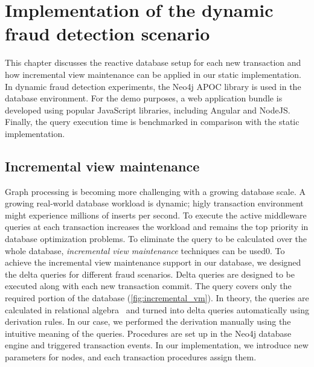 \chapter{Implementation of the dynamic fraud detection scenario}

This chapter discusses the reactive database setup for each new transaction and how incremental view maintenance can be applied in our static implementation.
In dynamic fraud detection experiments, the Neo4j APOC library is used in the database environment.
For the demo purposes, a web application bundle is developed using popular JavaScript libraries, including Angular and NodeJS.
Finally, the query execution time is benchmarked in comparison with the static implementation. 

\section{Incremental view maintenance}

Graph processing is becoming more challenging with a growing database scale.
A growing real-world database workload is dynamic; higly transaction environment might experience millions of inserts per second.
To execute the active middleware queries at each transaction increases the workload and remains the top priority in database optimization problems.
To eliminate the query to be calculated over the whole database, \emph{incremental view maintenance} techniques can be used0.
To achieve the incremental view maintenance support in our database, we designed the delta queries for different fraud scenarios.
Delta queries are designed to be executed along with each new transaction commit.
The query covers only the required portion of the database (\autoref{fig:incremental_vm}).
In theory, the queries are calculated in relational algebra~\cite{SzarnyasPhD} and turned into delta queries automatically using derivation rules. In our case, we performed the derivation manually using the intuitive meaning of the queries.
Procedures are set up in the Neo4j database engine and triggered transaction events.
In our implementation, we introduce new parameters for nodes, and each transaction procedures assign them.

